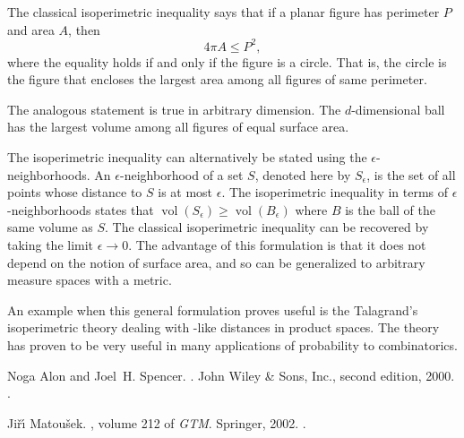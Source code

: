 \documentclass[12pt]{article}
\DeclareMathOperator{\vol}{vol}
\begin{document}
The classical isoperimetric inequality says that if a planar
figure has perimeter $P$ and area $A$, then
\begin{equation*}
4\pi A\leq P^2,
\end{equation*}
where the equality holds if and only if the figure is a circle.
That is, the circle is the figure that encloses the largest area
among all figures of same perimeter.

The analogous statement is true in arbitrary dimension. The
$d$-dimensional ball has the largest volume among all figures of
equal surface area.

The isoperimetric inequality can alternatively be stated using the
$\epsilon$-neighborhoods. An $\epsilon$-neighborhood of a set $S$,
denoted here by $S_\epsilon$, is the set of all points whose
distance to $S$ is at most $\epsilon$. The isoperimetric
inequality in terms of $\epsilon$-neighborhoods states that
$\vol(S_\epsilon)\geq \vol(B_\epsilon)$ where $B$ is the ball of
the same volume as $S$. The classical isoperimetric inequality can
be recovered by taking the limit $\epsilon\to 0$. 
The advantage of this formulation is that it
does not depend on the notion of surface area, and so can be
generalized to arbitrary measure spaces with a metric.

An example when this general formulation proves useful is the
Talagrand's isoperimetric theory dealing with -like
distances in product spaces. The theory has proven to be very
useful in many applications of probability to combinatorics.

\begin{thebibliography}{1}

Noga Alon and Joel~H. Spencer.
.
\newblock John Wiley \& Sons, Inc., second edition, 2000.
\newblock {}.

Ji{\v{r}}{\'\i} Matou{\v{s}}ek.
, volume 212 of {\em GTM}.
\newblock Springer, 2002.
\newblock {}.

\end{thebibliography}
\end{document}
